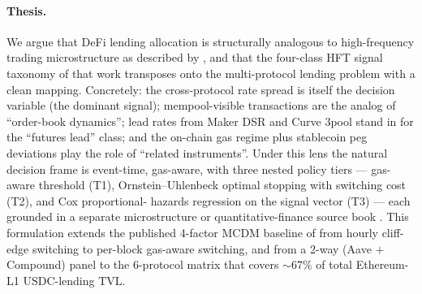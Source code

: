 \paragraph{Thesis.}
We argue that DeFi lending allocation is structurally analogous to
high-frequency trading microstructure as described by
\cite{mackenzie2021}, and that the four-class HFT signal taxonomy of
that work transposes onto the multi-protocol lending problem with a
clean mapping.  Concretely: the cross-protocol rate spread is itself
the decision variable (the dominant signal); mempool-visible
transactions are the analog of ``order-book dynamics''; lead rates
from Maker DSR and Curve 3pool stand in for the ``futures lead''
class; and the on-chain gas regime plus stablecoin peg deviations
play the role of ``related instruments''.  Under this lens the
natural decision frame is event-time, gas-aware, with three nested
policy tiers --- gas-aware threshold (T1), Ornstein--Uhlenbeck
optimal stopping with switching cost (T2), and Cox proportional-
hazards regression on the signal vector (T3) --- each grounded in a
separate microstructure or quantitative-finance source book
\cite{ohara1995, krause2005, kissell2014, lopezdeprado2018,
mackenzie2021}.  This formulation extends the published 4-factor
MCDM baseline of \cite{solovev2026vault} from hourly cliff-edge
switching to per-block gas-aware switching, and from a 2-way (Aave
$+$ Compound) panel to the 6-protocol matrix that covers
$\sim 67\%$ of total Ethereum-L1 USDC-lending TVL.

